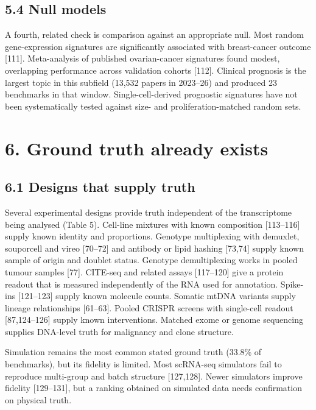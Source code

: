 \documentclass[11pt]{article}
\begin{document}
\subsection{5.4 Null models}\label{null-models}

A fourth, related check is comparison against an appropriate null. Most
random gene-expression signatures are significantly associated with
breast-cancer outcome {[}111{]}. Meta-analysis of published
ovarian-cancer signatures found modest, overlapping performance across
validation cohorts {[}112{]}. Clinical prognosis is the largest topic in
this subfield (13,532 papers in 2023--26) and produced 23 benchmarks in
that window. Single-cell-derived prognostic signatures have not been
systematically tested against size- and proliferation-matched random
sets.

\section{6. Ground truth already exists}\label{ground-truth-already-exists}

\subsection{6.1 Designs that supply truth}\label{designs-that-supply-truth}

Several experimental designs provide truth independent of the
transcriptome being analysed (Table 5). Cell-line mixtures with known
composition {[}113--116{]} supply known identity and proportions.
Genotype multiplexing with demuxlet, souporcell and vireo {[}70--72{]}
and antibody or lipid hashing {[}73,74{]} supply known sample of origin
and doublet status. Genotype demultiplexing works in pooled tumour
samples {[}77{]}. CITE-seq and related assays {[}117--120{]} give a
protein readout that is measured independently of the RNA used for
annotation. Spike-ins {[}121--123{]} supply known molecule counts.
Somatic mtDNA variants supply lineage relationships {[}61--63{]}. Pooled
CRISPR screens with single-cell readout {[}87,124--126{]} supply known
interventions. Matched exome or genome sequencing supplies DNA-level
truth for malignancy and clone structure.

Simulation remains the most common stated ground truth (33.8\% of
benchmarks), but its fidelity is limited. Most scRNA-seq simulators fail
to reproduce multi-group and batch structure {[}127,128{]}. Newer
simulators improve fidelity {[}129--131{]}, but a ranking obtained on
simulated data needs confirmation on physical truth.
\end{document}
